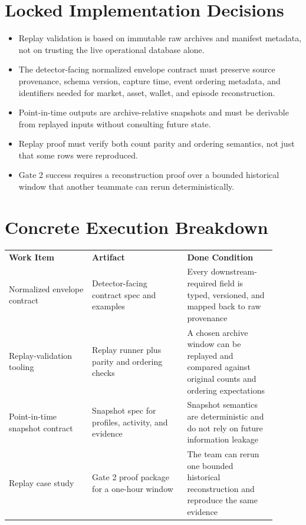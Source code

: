 \documentclass{article}
\begin{document}
\section*{Locked Implementation Decisions}
\begin{itemize}
\item Replay validation is based on immutable raw archives and manifest metadata, not on trusting the live operational database alone.
\item The detector-facing normalized envelope contract must preserve source provenance, schema version, capture time, event ordering metadata, and identifiers needed for market, asset, wallet, and episode reconstruction.
\item Point-in-time outputs are archive-relative snapshots and must be derivable from replayed inputs without consulting future state.
\item Replay proof must verify both count parity and ordering semantics, not just that some rows were reproduced.
\item Gate 2 success requires a reconstruction proof over a bounded historical window that another teammate can rerun deterministically.
\end{itemize}

\section*{Concrete Execution Breakdown}
\begin{longtable}{p{0.28\linewidth}p{0.32\linewidth}p{0.30\linewidth}}
\textbf{Work Item} & \textbf{Artifact} & \textbf{Done Condition} \\
Normalized envelope contract & Detector-facing contract spec and examples & Every downstream-required field is typed, versioned, and mapped back to raw provenance \\
Replay-validation tooling & Replay runner plus parity and ordering checks & A chosen archive window can be replayed and compared against original counts and ordering expectations \\
Point-in-time snapshot contract & Snapshot spec for profiles, activity, and evidence & Snapshot semantics are deterministic and do not rely on future information leakage \\
Replay case study & Gate 2 proof package for a one-hour window & The team can rerun one bounded historical reconstruction and reproduce the same evidence \\
\end{longtable}
\end{document}

